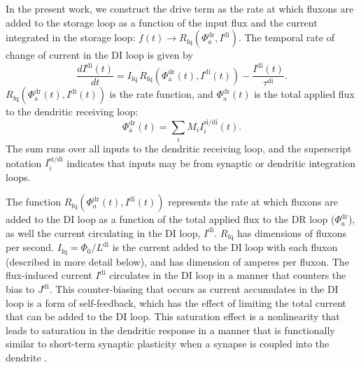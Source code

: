 \documentclass[twocolumn]{article}
\begin{document}
In the present work, we construct the drive term as the rate at which fluxons are added to the storage loop as a function of the input flux and the current integrated in the storage loop: $f(t)\rightarrow R_{\mathrm{fq}}(\Phi_a^{\mathrm{dr}},I^{\mathrm{di}})$. The temporal rate of change of current in the DI loop is given by
\begin{equation}
\label{eq:dendrites__leaky_integrator}
\frac{dI^{\mathrm{di}}(t)}{dt} = I_{\mathrm{fq}}\,R_{\mathrm{fq}}\! \left( \Phi^{\mathrm{dr}}_{\mathrm{a}}(t),I^{\mathrm{di}}(t) \right) - \frac{I^{\mathrm{di}}(t)}{\tau^{\mathrm{di}}}.
\end{equation}
$R_{\mathrm{fq}}\! \left( \Phi^{\mathrm{dr}}_{\mathrm{a}}(t),I^{\mathrm{di}}(t) \right)$ is the rate function, and $\Phi^{\mathrm{dr}}_{\mathrm{a}}(t)$ is the total applied flux to the dendritic receiving loop:
\begin{equation}
\label{eq:dendrites__applied_flux}
\Phi^{\mathrm{dr}}_{\mathrm{a}}(t) = \sum_i M_i I_i^{\mathrm{si/di}}(t).
\end{equation}
The sum runs over all inputs to the dendritic receiving loop, and the superscript notation $I_i^{\mathrm{si/di}}$ indicates that inputs may be from synaptic or dendritic integration loops.

The function $R_{\mathrm{fq}} \left( \Phi^{\mathrm{dr}}_a(t),I^{\mathrm{di}}(t) \right)$ represents the rate at which fluxons are added to the DI loop as a function of the total applied flux to the DR loop ($\Phi^{\mathrm{dr}}_a$), as well the current circulating in the DI loop, $I^{\mathrm{di}}$. $R_{\mathrm{fq}}$ has dimensions of fluxons per second. $I_{\mathrm{fq}} = \Phi_0/L^{\mathrm{di}}$ is the current added to the DI loop with each fluxon (described in more detail below), and has dimension of amperes per fluxon. The flux-induced current $I^{\mathrm{di}}$ circulates in the DI loop in a manner that counters the bias to $J^{\mathrm{di}}$. This counter-biasing that occurs as current accumulates in the DI loop is a form of self-feedback, which has the effect of limiting the total current that can be added to the DI loop. This saturation effect is a nonlinearity that leads to saturation in the dendritic response in a manner that is functionally similar to short-term synaptic plasticity when a synapse is coupled into the dendrite \cite{sh2020}.
\end{document}
